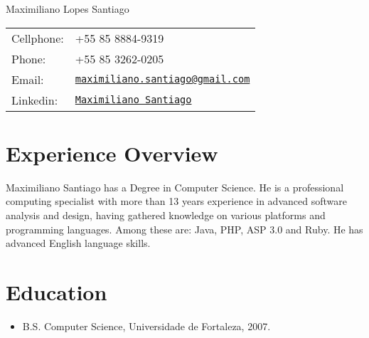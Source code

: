 \documentclass[letterpaper]{article}
\def\name{Maximiliano Lopes Santiago}
\begin{document}
\begin{flushright}

{\huge \name}


\vspace{0.25in}
\begin{minipage}{0.45\linewidth}
  \begin{tabular}{ll}
    Cellphone: & +55 85 8884-9319 \\
    Phone: &  +55 85 3262-0205 \\
    Email: & \href{mailto:maximiliano.santiago@gmail.com}{\tt maximiliano.santiago@gmail.com} \\
	Linkedin: & \href{http://www.linkedin.com/pub/maximiliano-santiago/a/145/b2a}{\tt Maximiliano Santiago} \\
  \end{tabular}
\end{minipage}
\end{flushright}
\section*{Experience Overview}

Maximiliano Santiago has a Degree in Computer Science. He is a professional computing
specialist with more than 13 years experience in advanced software analysis and design,
having gathered knowledge on various platforms and programming languages. Among these
are: Java, PHP, ASP 3.0 and Ruby.
He has advanced English language skills.


\section*{Education}

\begin{itemize}
  \item B.S. Computer Science, Universidade de Fortaleza, 2007.
\end{itemize}
\end{document}

